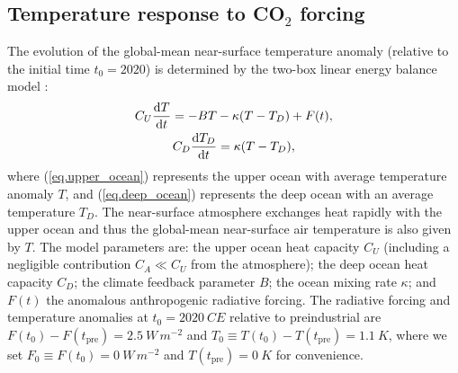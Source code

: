 \documentclass{article}
\begin{document}
\subsection{Temperature response to CO$_{2}$ forcing}
The evolution of the global-mean near-surface temperature anomaly (relative to the initial time $t_{0} = 2020$) is determined by the two-box linear energy balance model \citep[e.g][]{gregory_vertical_2000, held_probing_2010}:
\begin{gather}
    C_{U} \dv{T}{t} = -B T - \kappa( T - T_{D}) + F(t), \label{eq.upper_ocean}
    \\
    C_{D} \dv{T_{D}}{t} = \kappa (T - T_{D}),\label{eq.deep_ocean}
\end{gather}
where (\ref{eq.upper_ocean}) represents the upper ocean with average temperature anomaly $T$, and (\ref{eq.deep_ocean}) represents the deep ocean with an average temperature $T_{D}$. The near-surface atmosphere exchanges heat rapidly with the upper ocean and thus the global-mean near-surface air temperature is also given by $T$. The model parameters are: the upper ocean heat capacity $C_{U}$ (including a negligible contribution $C_{A} \ll C_{U}$ from the atmosphere); the deep ocean heat capacity $C_{D}$; the climate feedback parameter $B$; the ocean mixing rate $\kappa$; and $F(t)$ the anomalous anthropogenic radiative forcing. The radiative forcing and temperature anomalies at $t_{0} = \SI{2020}{CE}$ relative to preindustrial are $F(t_{0}) - F(t_{\text{pre}}) = \SI{2.5}{W\, m^{-2}}$ and $T_{0} \equiv T(t_{0}) - T(t_{\text{pre}}) = \SI{1.1}{K}$, where we set $F_{0} \equiv F(t_{0}) = \SI{0}{W\, m^{-2}}$ and $T(t_{\text{pre}}) = \SI{0}{K}$ for convenience.
\end{document}
